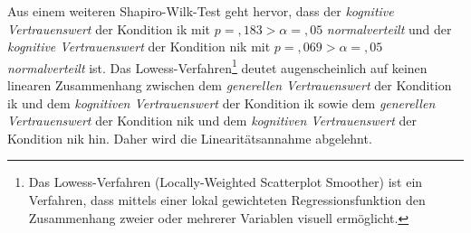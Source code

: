 \documentclass[a4paper,11pt]{article}%
\renewcommand{\\}{\vspace*{0.5\baselineskip} \newline}
\begin{document}
{Aus einem weiteren Shapiro-Wilk-Test geht hervor, dass der \textit{kognitive Vertrauenswert} der Kondition \ac{ik} mit  $p =,183 > \alpha = ,05$ \textit{normalverteilt} und der \textit{kognitive Vertrauenswert} der Kondition \ac{nik} mit $p =,069 > \alpha =,05$ \textit{normalverteilt} ist.
Das Lowess-Verfahren\footnote{Das Lowess-Verfahren (Locally-Weighted Scatterplot Smoother) ist ein Verfahren, dass mittels einer lokal gewichteten Regressionsfunktion den Zusammenhang zweier oder mehrerer Variablen visuell ermöglicht.} deutet augenscheinlich auf keinen linearen Zusammenhang zwischen dem \textit{generellen Vertrauenswert} der Kondition \ac{ik} und dem \textit{kognitiven Vertrauenswert} der Kondition \ac{ik} sowie dem \textit{generellen Vertrauenswert} der Kondition \ac{nik} und dem \textit{kognitiven Vertrauenswert} der Kondition \ac{nik} hin. Daher wird die Linearitätsannahme abgelehnt.

}
\end{document}
